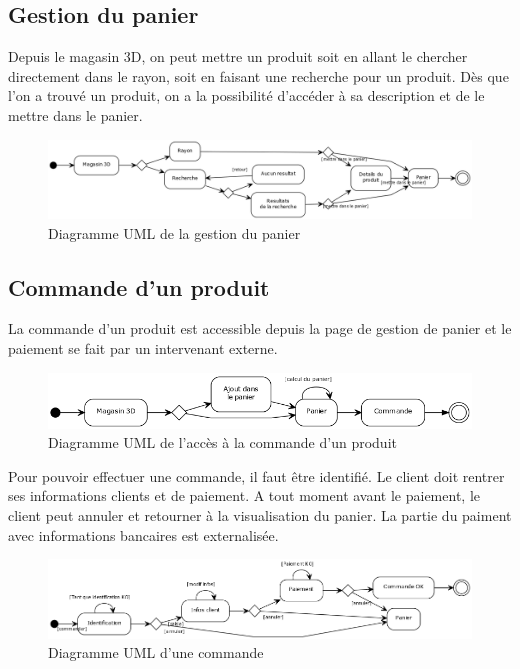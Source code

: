 \documentclass[12pt]{article}
\begin{document}
\subsection{Gestion du panier}

Depuis le magasin 3D, on peut mettre un produit soit en allant le chercher directement dans le rayon,
soit en faisant une recherche pour un produit. Dès que l'on a trouvé un produit, on a la possibilité d'accéder
à sa description et de le mettre dans le panier.

\begin{figure}[ht]
    \center
    \includegraphics[scale=0.4]{../Diagrams/ActivityDiagrams/panier.png}
    \caption*{Diagramme UML de la gestion du panier}
\end{figure}

\newpage
\subsection{Commande d'un produit}

La commande d'un produit est accessible depuis la page de gestion de panier et
le paiement se fait par un intervenant externe.

\begin{figure}[ht]
    \center
    \includegraphics[scale=0.55]{../Diagrams/ActivityDiagrams/commande_global.png}
    \caption*{Diagramme UML de l'accès à la commande d'un produit}
\end{figure}

Pour pouvoir effectuer une commande, il faut être identifié.
Le client doit rentrer ses informations clients et de paiement.
A tout moment avant le paiement, le client peut annuler et retourner à la visualisation du panier.
La partie du paiment avec informations bancaires est externalisée.

\begin{figure}[ht]
    \center
    \includegraphics[scale=0.45]{../Diagrams/ActivityDiagrams/commande_en_cours.png}
    \caption*{Diagramme UML d'une commande}
\end{figure}
\end{document}

